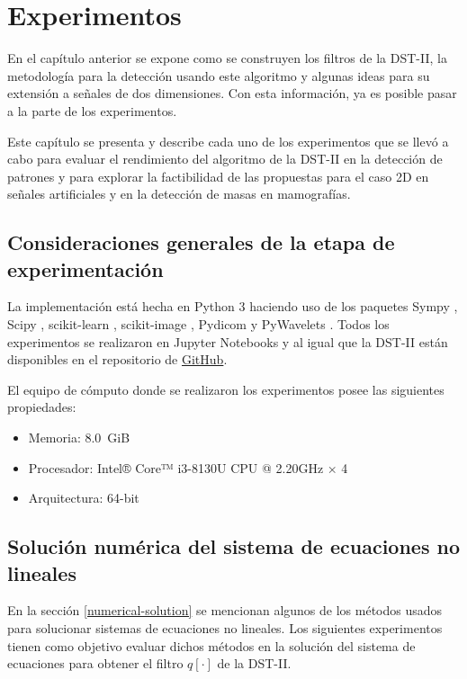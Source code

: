 \chapter{Experimentos}\label{chapter:implementation}

En el capítulo anterior se expone  como se construyen los filtros de la DST-II, la metodología para
la detección usando este algoritmo y algunas ideas para su extensión a señales de dos dimensiones. Con esta información,
ya es posible pasar a la parte de los experimentos. 

Este capítulo se presenta y describe cada uno de los experimentos que se llevó a cabo para evaluar el rendimiento 
del algoritmo de la DST-II en la detección de patrones y para explorar la factibilidad de las propuestas
para el caso 2D en señales artificiales y en la detección de masas en mamografías.

\section{Consideraciones generales de la etapa de experimentación}

La implementación está hecha en Python 3 \cite{python3} haciendo uso de los paquetes Sympy \cite{10.7717/peerj-cs.103}, 
Scipy \cite{2020SciPy-NMeth}, scikit-learn \cite{sklearn_api}, scikit-image \cite{van2014scikit},
Pydicom \cite{darcy_mason_2020_4313150}
y PyWavelets \cite{Lee2019}. Todos los experimentos se 
realizaron en Jupyter Notebooks \cite{Kluyver2016jupyter} y al igual que la DST-II están disponibles en el repositorio de
\href{https://github.com/adrian13579/discrete-shapelet-transform}{GitHub}.

El equipo de cómputo donde se realizaron los experimentos posee las siguientes propiedades:

\begin{itemize}
	\item Memoria: 8.0 GiB
	\item Procesador: Intel® Core™ i3-8130U CPU @ 2.20GHz × 4
	\item Arquitectura: 64-bit
\end{itemize}


\section{Solución numérica del sistema de ecuaciones no lineales}

En la sección \ref{numerical-solution} se mencionan algunos de los métodos usados para solucionar sistemas de 
ecuaciones no lineales. Los siguientes experimentos tienen como objetivo evaluar dichos métodos en la solución
del sistema de ecuaciones para obtener el filtro $q[\cdot]$ de la DST-II.

